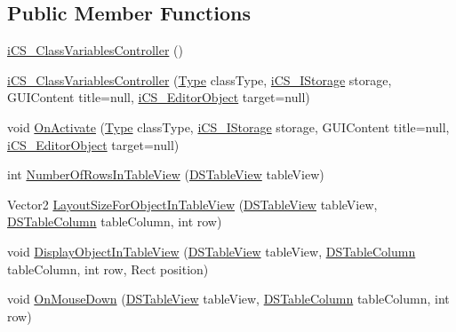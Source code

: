 \subsection*{Public Member Functions}
\begin{DoxyCompactItemize}
\item 
\hyperlink{classi_c_s___class_variables_controller_a25bc3c5f0596627b12b3db6522d67008}{i\+C\+S\+\_\+\+Class\+Variables\+Controller} ()
\item 
\hyperlink{classi_c_s___class_variables_controller_a40993528860457269582aacdc4f10f3c}{i\+C\+S\+\_\+\+Class\+Variables\+Controller} (\hyperlink{i_c_s___object_type_enum_8cs_ae6c3dd6d8597380b56d94908eb431547aa1fa27779242b4902f7ae3bdd5c6d508}{Type} class\+Type, \hyperlink{classi_c_s___i_storage}{i\+C\+S\+\_\+\+I\+Storage} storage, G\+U\+I\+Content title=null, \hyperlink{classi_c_s___editor_object}{i\+C\+S\+\_\+\+Editor\+Object} target=null)
\item 
void \hyperlink{classi_c_s___class_variables_controller_a47880441158d8944c33933e3f4e168d9}{On\+Activate} (\hyperlink{i_c_s___object_type_enum_8cs_ae6c3dd6d8597380b56d94908eb431547aa1fa27779242b4902f7ae3bdd5c6d508}{Type} class\+Type, \hyperlink{classi_c_s___i_storage}{i\+C\+S\+\_\+\+I\+Storage} storage, G\+U\+I\+Content title=null, \hyperlink{classi_c_s___editor_object}{i\+C\+S\+\_\+\+Editor\+Object} target=null)
\item 
int \hyperlink{classi_c_s___class_variables_controller_a1d8c68a5c1ca50dea83b404f4dd20257}{Number\+Of\+Rows\+In\+Table\+View} (\hyperlink{class_d_s_table_view}{D\+S\+Table\+View} table\+View)
\item 
Vector2 \hyperlink{classi_c_s___class_variables_controller_abad6e8113039e9f0cd40c7ce567032b0}{Layout\+Size\+For\+Object\+In\+Table\+View} (\hyperlink{class_d_s_table_view}{D\+S\+Table\+View} table\+View, \hyperlink{class_d_s_table_column}{D\+S\+Table\+Column} table\+Column, int row)
\item 
void \hyperlink{classi_c_s___class_variables_controller_ad522be85628f7645bff0662c13dff6a5}{Display\+Object\+In\+Table\+View} (\hyperlink{class_d_s_table_view}{D\+S\+Table\+View} table\+View, \hyperlink{class_d_s_table_column}{D\+S\+Table\+Column} table\+Column, int row, Rect position)
\item 
void \hyperlink{classi_c_s___class_variables_controller_a4d4ab533337722d3259940ba68504af2}{On\+Mouse\+Down} (\hyperlink{class_d_s_table_view}{D\+S\+Table\+View} table\+View, \hyperlink{class_d_s_table_column}{D\+S\+Table\+Column} table\+Column, int row)
\end{DoxyCompactItemize}
